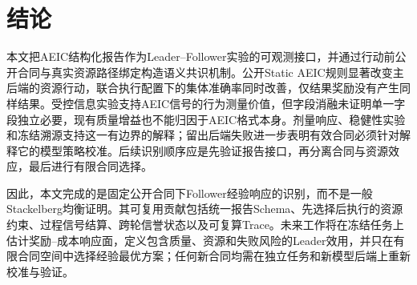 \section{结论}\label{sec:conclusion}
本文把AEIC结构化报告作为Leader--Follower实验的可观测接口，并通过行动前公开合同与真实资源路径绑定构造语义共识机制。公开Static AEIC规则显著改变主后端的资源行动，联合执行配置下的集体准确率同时改善，仅结果奖励没有产生同样结果。受控信息实验支持AEIC信号的行为测量价值，但字段消融未证明单一字段独立必要，现有质量增益也不能归因于AEIC格式本身。剂量响应、稳健性实验和冻结溯源支持这一有边界的解释；留出后端失败进一步表明有效合同必须针对解释它的模型策略校准。后续识别顺序应是先验证报告接口，再分离合同与资源效应，最后进行有限合同选择。

因此，本文完成的是固定公开合同下Follower经验响应的识别，而不是一般Stackelberg均衡证明。其可复用贡献包括统一报告Schema、先选择后执行的资源约束、过程信号结算、跨轮信誉状态以及可复算Trace。未来工作将在冻结任务上估计奖励--成本响应面，定义包含质量、资源和失败风险的Leader效用，并只在有限合同空间中选择经验最优方案；任何新合同均需在独立任务和新模型后端上重新校准与验证。
